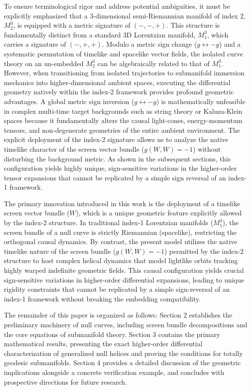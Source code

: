 \documentclass [reqno]{amsart}
\theoremstyle{plain}
\numberwithin{equation}{section}
\begin{document}
To ensure terminological rigor and address potential ambiguities, it must be explicitly emphasized that a 3-dimensional semi-Riemannian manifold of index $2$, $M_2^3$, is equipped with a metric signature of $(-,-,+)$. This structure is fundamentally distinct from a standard 3D Lorentzian manifold, $M_1^3$, which carries a signature of $(-,+,+)$. Modulo a metric sign change ($g \leftrightarrow -g$) and a systematic permutation of timelike and spacelike vector fields, the isolated curve theory on an un-embedded $M_2^3$ can be algebraically related to that of $M_1^3$. However, when transitioning from isolated trajectories to submanifold immersion mechanics into higher-dimensional ambient spaces, executing the differential geometry natively within the index-2 framework provides profound geometric advantages. A global metric sign inversion ($g \leftrightarrow -g$) is mathematically unfeasible in complex multi-time target backgrounds such as string theory or Kaluza-Klein spaces because it fundamentally alters the causal light-cones, energy-momentum tensors, and non-degenerate geometries of the entire ambient environment. The explicit deployment of the index-2 signature allows us to analyze the native timelike character of the screen vector bundle ($g(W,W)=-1$) without disturbing the background metric. As shown in the subsequent sections, this configuration yields highly unique, sign-sensitive variations in the higher-order tensor expansions that cannot be replicated by a simple sign reversal of an index-1 framework.

The primary innovation introduced in this work is the deployment of a timelike screen vector bundle ($W$), which is a unique geometric feature explicitly allowed by the index-2 structure. In traditional index-1 Lorentzian manifolds ($M_1^3$), the screen bundle of a null curve is strictly Riemannian (spacelike), restricting the orthogonal causal dynamics. By contrast, the present model utilizes the native timelike nature of the screen bundle ($g(W,W)=-1$) permitted by the index-2 structure to host complex helical dynamics that model lightlike orbits tracking highly warped indefinite geometric fields. This causal configuration yields crucial sign-sensitive variations in higher-order differential expansions, leading to unique rigidity constraints that cannot be replicated by a simple sign-reversal of an index-1 framework without breaking the embedding compatibility.

The remainder of this paper is organized as follows: Section 2 establishes the preliminary machinery of null curves, including screen bundle decompositions and the core equations of submanifold theory. Section 3 contains the primary mathematical results, presenting the exact higher-order differential characterization of generalized null helices and proving the conditions for totally geodesic submanifolds. Section 4 provides a detailed discussion of the geometric implications alongside a concrete verification example, and concludes with prospective directions for future research.
\end{document}

